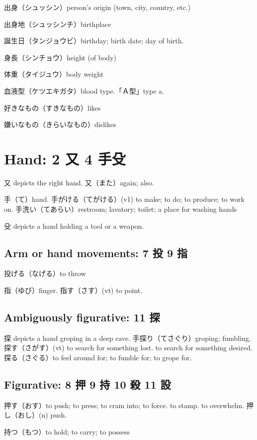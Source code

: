 出身（シュッシン）person's origin (town, city, country, etc.)

出身地（シュッシンチ）birthplace

誕生日（タンジョウビ）birthday; birth date; day of birth.

身長（シンチョウ）height (of body)

体重（タイジュウ）body weight

血液型（ケツエキガタ）blood type.「Ａ型」type a.

好きなもの（すきなもの）likes

嫌いなもの（きらいなもの）dislikes

\section{Hand: 2 又 4 手殳}

又 depicts the right hand.
又（また）again; also.

手（て）hand.
手がける（てがける）(v1) to make; to do; to produce; to work on.
手洗い（てあらい）restroom; lavatory; toilet; a place for washing hands

殳 depicts a hand holding a tool or a weapon.

\subsection{Arm or hand movements: 7 投 9 指}

投げる（なげる）to throw

指（ゆび）finger.
指す（さす）(vt) to point.

\subsection{Ambiguously figurative: 11 探}

探 depicts a hand groping in a deep cave.
手探り（てさぐり）groping; fumbling.
探す（さがす）(vt)
to search for something lost.
to search for something desired.
探る（さぐる）to feel around for; to fumble for; to grope for.

\subsection{Figurative: 8 押 9 持 10 殺 11 設}

押す（おす）to push; to press; to cram into; to force.
to stamp.
to overwhelm.
押し（おし）(n) push.

持つ（もつ）to hold; to carry; to possess


